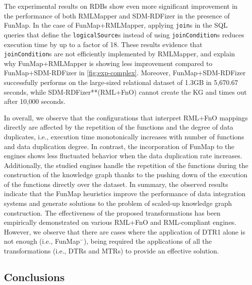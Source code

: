 The experimental results on RDBs show even more significant improvement in the performance of both RMLMapper and SDM-RDFizer in the presence of FunMap. In the case of FunMap+RMLMapper, applying \verb|join|s in the SQL queries that define the \verb|logicalSource|s instead of using \verb|joinCondition|s reduces execution time by up to a factor of 18. These results evidence that \verb|joinCondition|s are not efficiently implemented by RMLMapper, and explain why FunMap+RMLMapper is showing less improvement compared to FunMap+SDM-RDFizer in \autoref{fig:exp-complex}. Moreover, FunMap+SDM-RDFizer successfully performs on the large-sized relational dataset of 1.3GB in 5,670.67 seconds, while SDM-RDFizer**(RML+FnO) cannot create the KG and times out after 10,000 seconds.

In overall, we observe that the configurations that interpret RML+FnO mappings directly are affected by the repetition of the functions and the degree of data duplicates, i.e., execution time monotonically increases with number of functions and data duplication degree. In contrast, the incorporation of FunMap to the engines shows less fluctuated behavior when the data duplication rate increases. Additionally, the studied engines handle the repetition of the functions during the construction of the knowledge graph thanks to the pushing down of the execution of the functions directly over the dataset.
In summary, the observed results indicate that the FunMap heuristics improve the performance of data integration systems and generate solutions to the problem of scaled-up knowledge graph construction. The effectiveness of the proposed transformations has been empirically demonstrated on various RML+FnO and RML-compliant engines. However, we observe that there are cases where the application of DTR1 alone is not enough (i.e., FunMap$^-$), being required the applications of all the transformations (i.e., DTRs and MTRs) to provide an effective solution. 


\subsection{Conclusions}

